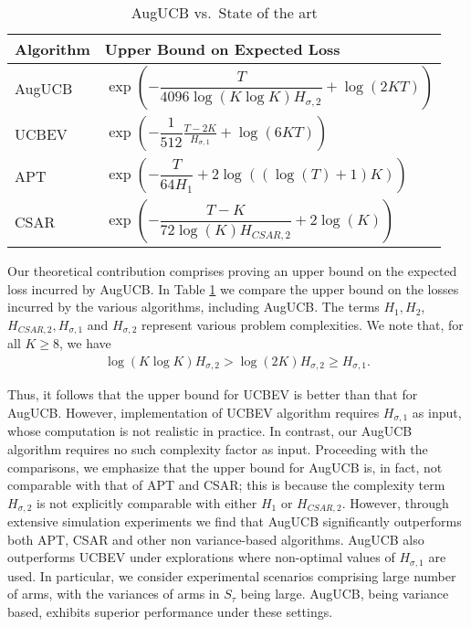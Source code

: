 \documentclass[MS,synopsis]{iitmdiss}
\begin{document}
\begin{table}[b]
\caption{AugUCB vs.\ State of the art}
\label{tab:regret-bds}
\begin{center}
\begin{tabular}{|p{2.3cm}|p{8.4cm}|}
\hline
Algorithm  & Upper Bound on Expected Loss \\
\hline
\hline
AugUCB      &$ \exp\left(- \dfrac{T}{4096 \log(K\log K)H_{\sigma,2}} + \log\left(2KT\right) \right) $ \\
\hline
\hline
UCBEV		&$\exp\left(-\dfrac{1}{512}\frac{T-2K}{H_{\sigma,1}} + \log\left(6KT\right)\right)$ \\
\hline
\hline
APT         &$\exp\left(-\dfrac{T}{64 H_1}+2\log((\log(T)+1)K)\right)$ \\
\hline
\hline
CSAR		&$\exp\left(-\dfrac{T-K}{72\log(K)H_{CSAR,2}}+2\log(K)\right)$ \\
\hline
\end{tabular}
\end{center}
\end{table}

Our theoretical contribution comprises proving an upper bound on the expected loss incurred by AugUCB. In Table \ref{tab:regret-bds} we compare the upper bound on the losses incurred by the various algorithms, including AugUCB. The terms $H_1, H_2$, $H_{CSAR,2}, H_{\sigma,1}$ and $H_{\sigma,2}$ represent various problem complexities. We note that, for all $K\ge 8$, we have
\begin{align*}
\log\left(K\log K\right) H_{\sigma,2} > \log(2K) H_{\sigma,2} \ge H_{\sigma,1}.
\end{align*}

Thus, it follows that the upper bound for UCBEV \citep{gabillon2011multi} is better than that for AugUCB. However, implementation of UCBEV algorithm requires $H_{\sigma,1}$ as input, whose computation is not realistic in practice. In contrast, our AugUCB algorithm requires no such complexity factor as input. Proceeding with the comparisons, we emphasize that the upper bound for  AugUCB is, in fact, not comparable with that of APT and CSAR; this is because the complexity term $H_{\sigma,2}$ is not explicitly comparable with either $H_1$ or $H_{CSAR,2}$. However, through extensive simulation experiments we find that AugUCB significantly outperforms both APT, CSAR and other non variance-based algorithms. AugUCB also outperforms UCBEV under explorations where non-optimal values of $H_{\sigma,1}$  are used. In particular, we consider experimental scenarios comprising large number of arms, with the variances of arms in $S_\tau$ being large. AugUCB, being variance based, exhibits superior performance under these settings.  
\end{document}
